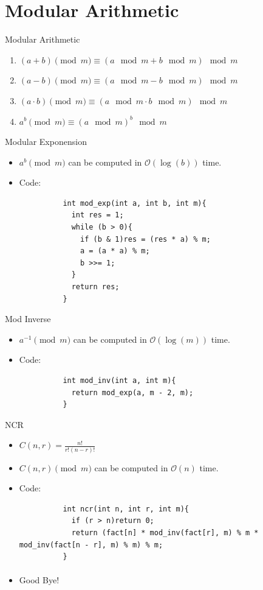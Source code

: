 \documentclass{beamer}
\begin{document}
\section{Modular Arithmetic}
\begin{frame}[fragile]{Modular Arithmetic}
  \begin{enumerate}
    \item $(a + b) \pmod m \equiv (a \mod m + b \mod m) \mod m$ 
    \item $(a - b) \pmod m \equiv (a \mod m - b \mod m) \mod m$
    \item $(a \cdot b) \pmod m \equiv (a \mod m \cdot b \mod m) \mod m$
    \item $a^b \pmod m \equiv (a \mod m)^b \mod m$
  \end{enumerate}
\end{frame}

\begin{frame}[fragile]{Modular Exponension}
  \begin{itemize}
    \item<1-> $a^b \pmod m$ can be computed in $\mathcal{O}(\log(b))$ time.
    \item<2-> Code:
        \begin{verbatim}
          int mod_exp(int a, int b, int m){
            int res = 1;
            while (b > 0){
              if (b & 1)res = (res * a) % m;
              a = (a * a) % m;
              b >>= 1;
            }
            return res;
          }
        \end{verbatim}
  \end{itemize}
\end{frame}
\begin{frame}[fragile]{Mod Inverse}
  \begin{itemize}
    \item<1-> $a^{-1} \pmod m$ can be computed in $\mathcal{O}(\log(m))$ time.
    \item<2-> Code:
        \begin{verbatim}
          int mod_inv(int a, int m){
            return mod_exp(a, m - 2, m);
          }
        \end{verbatim}
  \end{itemize}
\end{frame}
\begin{frame}[fragile]{NCR}
  \begin{itemize}
    \item<1-> $C(n, r) = \frac{n!}{r!(n - r)!}$
    \item<2-> $C(n, r) \pmod m$ can be computed in $\mathcal{O}(n)$ time.
    \item<3-> Code:
        \begin{verbatim}
          int ncr(int n, int r, int m){
            if (r > n)return 0;
            return (fact[n] * mod_inv(fact[r], m) % m * mod_inv(fact[n - r], m) % m) % m;
          }
        \end{verbatim}
  \end{itemize}
\end{frame}



\begin{frame}{}
\framesubtitle{}
\begin{itemize}
    \item<1-> \begin{center}
        \large{Good Bye!}
    \end{center}
\end{itemize}

\end{frame}
\end{document}
